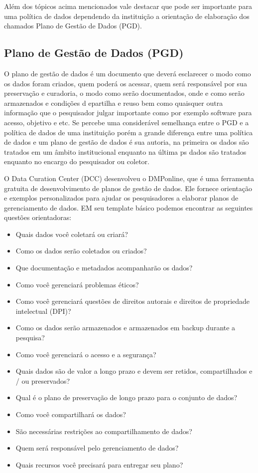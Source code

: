 \documentclass[12pt,hidelinks]{article}
\begin{document}
Além dos tópicos acima mencionados vale destacar que pode ser importante para uma política de dados dependendo da instituição a orientação de elaboração dos chamados Plano de Gestão de Dados (PGD).

\subsection{Plano de Gestão de Dados (PGD)}

\qquad O plano de gestão de dados é um documento que deverá esclarecer o modo como os dados foram criados, quem poderá os acessar, quem será responsável por sua preservação e curadoria, o modo como serão documentados, onde e como serão armazenados e condições d epartilha e reuso bem como quaisquer outra informação que o pesquisador julgar importante como por exemplo software para acesso, objetivo e etc. Se percebe uma considerável semelhança entre o PGD e a política de dados de uma instituição porém a grande diferença entre uma política de dados e um plano de gestão de dados é sua autoria, na primeira os dados são tratados em um âmbito institucional enquanto na última ps dados são tratados enquanto no encargo do pesquisador ou coletor.

O Data Curation Center (DCC) desenvolveu o DMPonline, que é uma ferramenta gratuita de desenvolvimento de planos de gestão de dados. Ele fornece orientação e exemplos personalizados para ajudar os pesquisadores a elaborar planos de gerenciamento de dados. EM seu template básico podemos encontrar as seguintes questões orientadoras:

\begin{itemize}
    \item Quais dados você coletará ou criará?
    \item Como os dados serão coletados ou criados?
    \item Que documentação e metadados acompanharão os dados?
    \item Como você gerenciará problemas éticos?
    \item Como você gerenciará questões de direitos autorais e direitos de propriedade intelectual (DPI)?
    \item Como os dados serão armazenados e armazenados em backup durante a pesquisa?
    \item Como você gerenciará o acesso e a segurança?
    \item Quais dados são de valor a longo prazo e devem ser retidos, compartilhados e / ou preservados?
    \item Qual é o plano de preservação de longo prazo para o conjunto de dados?
    \item Como você compartilhará os dados?
    \item São necessárias restrições ao compartilhamento de dados?
    \item Quem será responsável pelo gerenciamento de dados?
    \item Quais recursos você precisará para entregar seu plano?
\end{itemize}
\end{document}

